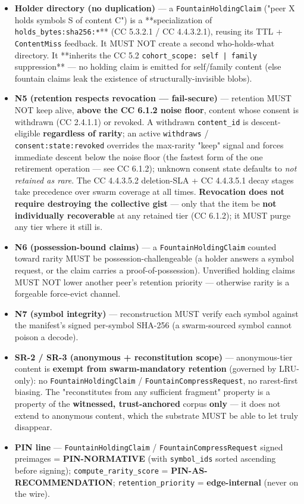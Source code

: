 \documentclass[11pt]{article}
\begin{document}
\begin{itemize}\setlength\itemsep{0pt}
\item \textbf{Holder directory (no duplication)} — a \texttt{FountainHoldingClaim} ("peer X holds symbols S of content C") is a **specialization of \texttt{holds\_bytes:sha256:*}** (CC 5.3.2.1 / CC 4.4.3.2.1), reusing its TTL + \texttt{ContentMiss} feedback. It MUST NOT create a second who-holds-what directory. It **inherits the CC 5.2 \texttt{cohort\_scope: self | family} suppression** — no holding claim is emitted for self/family content (else fountain claims leak the existence of structurally-invisible blobs).
\item \textbf{N5 (retention respects revocation — fail-secure)} — retention MUST NOT keep alive, \textbf{above the CC 6.1.2 noise floor}, content whose consent is withdrawn (CC 2.4.1.1) or revoked. A withdrawn \texttt{content\_id} is descent-eligible \textbf{regardless of rarity}; an active \texttt{withdraws} / \texttt{consent:state:revoked} overrides the max-rarity "keep" signal and forces immediate descent below the noise floor (the fastest form of the one retirement operation — see CC 6.1.2); unknown consent state defaults to \textit{not retained as rare}. The CC 4.4.3.5.2 deletion-SLA + CC 4.4.3.5.1 decay stages take precedence over swarm coverage at all times. \textbf{Revocation does not require destroying the collective gist} — only that the item be \textbf{not individually recoverable} at any retained tier (CC 6.1.2); it MUST purge any tier where it still is.
\item \textbf{N6 (possession-bound claims)} — a \texttt{FountainHoldingClaim} counted toward rarity MUST be possession-challengeable (a holder answers a symbol request, or the claim carries a proof-of-possession). Unverified holding claims MUST NOT lower another peer's retention priority — otherwise rarity is a forgeable force-evict channel.
\item \textbf{N7 (symbol integrity)} — reconstruction MUST verify each symbol against the manifest's signed per-symbol SHA-256 (a swarm-sourced symbol cannot poison a decode).
\item \textbf{SR-2 / SR-3 (anonymous + reconstitution scope)} — anonymous-tier content is \textbf{exempt from swarm-mandatory retention} (governed by LRU-only): no \texttt{FountainHoldingClaim} / \texttt{FountainCompressRequest}, no rarest-first biasing. The "reconstitutes from any sufficient fragment" property is a property of the \textbf{witnessed, trust-anchored} corpus \textbf{only} — it does not extend to anonymous content, which the substrate MUST be able to let truly disappear.
\item \textbf{PIN line} — \texttt{FountainHoldingClaim} / \texttt{FountainCompressRequest} signed preimages = \textbf{PIN-NORMATIVE} (with \texttt{symbol\_ids} sorted ascending before signing); \texttt{compute\_rarity\_score} = \textbf{PIN-AS-RECOMMENDATION}; \texttt{retention\_priority} = \textbf{edge-internal} (never on the wire).
\end{itemize}
\end{document}
